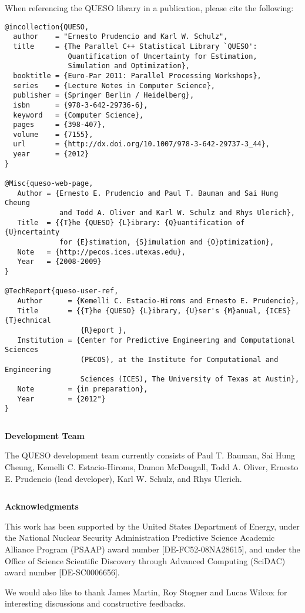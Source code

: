 When referencing the QUESO library in a publication, please cite the following:
\begin{verbatim}
@incollection{QUESO,
  author    = "Ernesto Prudencio and Karl W. Schulz",
  title     = {The Parallel C++ Statistical Library `QUESO':
               Quantification of Uncertainty for Estimation,
               Simulation and Optimization},
  booktitle = {Euro-Par 2011: Parallel Processing Workshops},
  series    = {Lecture Notes in Computer Science},
  publisher = {Springer Berlin / Heidelberg},
  isbn      = {978-3-642-29736-6},
  keyword   = {Computer Science},
  pages     = {398-407},
  volume    = {7155},
  url       = {http://dx.doi.org/10.1007/978-3-642-29737-3_44},
  year      = {2012}
}

@Misc{queso-web-page,
   Author = {Ernesto E. Prudencio and Paul T. Bauman and Sai Hung Cheung
             and Todd A. Oliver and Karl W. Schulz and Rhys Ulerich},
   Title  = {{T}he {QUESO} {L}ibrary: {Q}uantification of {U}ncertainty
             for {E}stimation, {S}imulation and {O}ptimization},
   Note   = {http://pecos.ices.utexas.edu},
   Year   = {2008-2009}
}

@TechReport{queso-user-ref,
   Author      = {Kemelli C. Estacio-Hiroms and Ernesto E. Prudencio},
   Title       = {{T}he {QUESO} {L}ibrary, {U}ser's {M}anual, {ICES} {T}echnical
                  {R}eport },
   Institution = {Center for Predictive Engineering and Computational Sciences
                  (PECOS), at the Institute for Computational and Engineering
                  Sciences (ICES), The University of Texas at Austin},
   Note        = {in preparation},
   Year        = {2012"}
}
\end{verbatim}
$~$\\
$~$\\


\centerline{\bf \Queso{} Development Team}
The QUESO development team currently consists of
Paul T. Bauman,
Sai Hung Cheung,
Kemelli C. Estacio-Hiroms,
Damon McDougall,
Todd A. Oliver,
Ernesto E. Prudencio (lead developer),
Karl W. Schulz, and
Rhys Ulerich.

$~$\\
$~$\\

\centerline{\bf Acknowledgments}

This work has been supported by the United States Department of Energy,
under the National Nuclear Security Administration Predictive Science Academic Alliance Program (PSAAP) award number [DE-FC52-08NA28615], and
under the Office of Science Scientific Discovery through Advanced Computing (SciDAC) award number [DE-SC0006656].


We would also like to thank
James Martin,
Roy Stogner and
Lucas Wilcox
for interesting discussions and constructive feedbacks.

